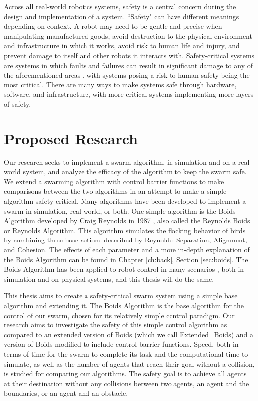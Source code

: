 Across all real-world robotics systems, safety is a central concern during the design and implementation of a system. ``Safety" can have different meanings depending on context. A robot may need to be gentle and precise when manipulating manufactured goods, avoid destruction to the physical environment and infrastructure in which it works, avoid risk to human life and injury, and prevent damage to itself and other robots it interacts with. Safety-critical systems are systems in which faults and failures can result in significant damage to any of the aforementioned areas \cite{knight2002safety}, with systems posing a risk to human safety being the most critical. There are many ways to make systems safe through hardware, software, and infrastructure, with more critical systems implementing more layers of safety. 

\section{Proposed Research}

Our research seeks to implement a swarm algorithm, in simulation and on a real-world system, and analyze the efficacy of the algorithm to keep the swarm safe. We extend a swarming algorithm with control barrier functions to make comparisons between the two algorithms in an attempt to make a simple algorithm safety-critical. Many algorithms have been developed to implement a swarm in simulation, real-world, or both. One simple algorithm is the Boids Algorithm developed by Craig Reynolds in 1987 \cite{reynolds1987flocks}, also called the Reynolds Boids or Reynolds Algorithm. This algorithm simulates the flocking behavior of birds by combining three base actions described by Reynolds: Separation, Alignment, and Cohesion. The effects of each parameter and a more in-depth explanation of the Boids Algorithm can be found in Chapter \ref{ch:back}, Section \ref{sec:boids}. The Boids Algorithm has been applied to robot control in many scenarios \cite{kasmarik2020autonomous,clark2012flight,jakimovski2008swarm}, both in simulation and on physical systems, and this thesis will do the same. 

This thesis aims to create a safety-critical swarm system using a simple base algorithm and extending it. The Boids Algorithm is the base algorithm for the control of our swarm, chosen for its relatively simple control paradigm. Our research aims to investigate the safety of this simple control algorithm as compared to an extended version of Boids (which we call Extended\_Boids) and a version of Boids modified to include control barrier functions. Speed, both in terms of time for the swarm to complete its task and the computational time to simulate, as well as the number of agents that reach their goal without a collision, is studied for comparing our algorithms. The safety goal is to achieve all agents at their destination without any collisions between two agents, an agent and the boundaries, or an agent and an obstacle. 

